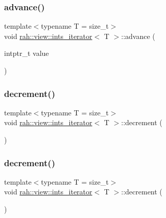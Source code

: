 \subsubsection{\texorpdfstring{advance()}{advance()}\hspace{0.1cm}{\footnotesize\ttfamily [2/2]}}
{\footnotesize\ttfamily template$<$typename T  = size\+\_\+t$>$ \\
void \mbox{\hyperlink{structrah_1_1view_1_1ints__iterator}{rah\+::view\+::ints\+\_\+iterator}}$<$ T $>$\+::advance (\begin{DoxyParamCaption}\item[{intptr\+\_\+t}]{value }\end{DoxyParamCaption})\hspace{0.3cm}{\ttfamily [inline]}}

\mbox{\label{structrah_1_1view_1_1ints__iterator_a08516717bcf1a7e7569863aa05b19392}} 
\subsubsection{\texorpdfstring{decrement()}{decrement()}\hspace{0.1cm}{\footnotesize\ttfamily [1/2]}}
{\footnotesize\ttfamily template$<$typename T  = size\+\_\+t$>$ \\
void \mbox{\hyperlink{structrah_1_1view_1_1ints__iterator}{rah\+::view\+::ints\+\_\+iterator}}$<$ T $>$\+::decrement (\begin{DoxyParamCaption}{ }\end{DoxyParamCaption})\hspace{0.3cm}{\ttfamily [inline]}}

\mbox{\label{structrah_1_1view_1_1ints__iterator_a08516717bcf1a7e7569863aa05b19392}} 
\subsubsection{\texorpdfstring{decrement()}{decrement()}\hspace{0.1cm}{\footnotesize\ttfamily [2/2]}}
{\footnotesize\ttfamily template$<$typename T  = size\+\_\+t$>$ \\
void \mbox{\hyperlink{structrah_1_1view_1_1ints__iterator}{rah\+::view\+::ints\+\_\+iterator}}$<$ T $>$\+::decrement (\begin{DoxyParamCaption}{ }\end{DoxyParamCaption})\hspace{0.3cm}{\ttfamily [inline]}}

